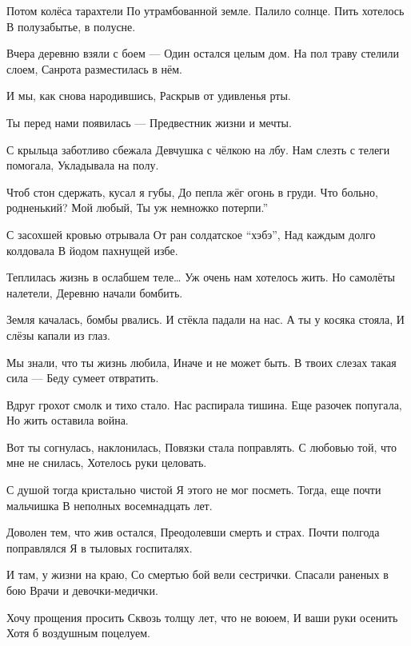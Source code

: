 Потом колёса тарахтели
По утрамбованной земле.
Палило солнце. Пить хотелось
В полузабытье, в полусне.

Вчера деревню взяли с боем ---
Один остался целым дом.
На пол траву стелили слоем,
Санрота разместилась в нём.

И мы, как снова народившись,
Раскрыв от удивленья рты.

\vfill\eject

\kern1cm

Ты перед нами появилась ---
Предвестник жизни и мечты.

С крыльца заботливо сбежала
Девчушка с чёлкою на лбу.
Нам слезть с телеги помогала,
Укладывала на полу.

Чтоб стон сдержать, кусал я губы,
До пепла жёг огонь в груди.
\leavevmode{}Что больно, родненький? Мой любый,
Ты уж немножко потерпи.''

С засохшей кровью отрывала
От ран солдатское ``хэбэ'',
Над каждым долго колдовала
В йодом пахнущей избе.

Теплилась жизнь в ослабшем теле\dots
Уж очень нам хотелось жить.
Но самолёты налетели,
Деревню начали бомбить.

Земля качалась, бомбы рвались.
И стёкла падали на нас.
А ты у косяка стояла,
И слёзы капали из глаз.

Мы знали, что ты жизнь любила,
Иначе и не может быть.
В твоих слезах такая сила ---
Беду сумеет отвратить.

\vfill\eject

\kern1cm

Вдруг грохот смолк и тихо стало.
Нас распирала тишина.
Еще разочек попугала,
Но жить оставила война.

Вот ты согнулась, наклонилась,
Повязки стала поправлять.
С любовью той, что мне не снилась,
Хотелось руки целовать.

С душой тогда кристально чистой
Я этого не мог посметь.
Тогда, еще почти мальчишка
В неполных восемнадцать лет.

Доволен тем, что жив остался,
Преодолевши смерть и страх.
Почти полгода поправлялся
Я в тыловых госпиталях.

И там, у жизни на краю,
Со смертью бой вели сестрички.
Спасали раненых в бою
Врачи и девочки-медички.

Хочу прощения просить
Сквозь толщу лет, что не воюем,
И ваши руки осенить
Хотя б воздушным поцелуем.

\vfill\eject

\kern1.4cm

